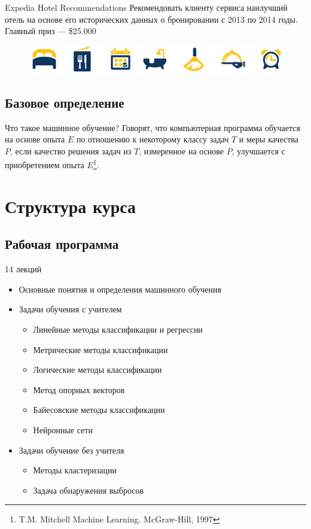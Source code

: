\documentclass{beamer}
\begin{document}
\begin{frame}{Expedia Hotel Recommendations}
    Рекомендовать клиенту сервиса наилучший отель на основе его исторических данных о бронировании с 2013 по 2014 годы. Главный приз --- \$25.000
    \begin{figure}
        \includegraphics[width=\textwidth]{fig/expedia_icons.png}
    \end{figure}
\end{frame}

\subsection{Базовое определение}
\begin{frame}{Что такое машинное обучение?}
    Говорят, что компьютерная программа обучается на основе опыта $E$ по отношению к некоторому классу задач $T$ и меры качества $P$, если качество решения задач из $T$, измеренное на основе $P$, улучшается с приобретением опыта $E$\footnote{T.M. Mitchell Machine Learning. McGraw-Hill, 1997}.
\end{frame}

\section{Структура курса}
\subsection{Рабочая программа}
\begin{frame}{14 лекций}
    \begin{itemize}
        \item Основные понятия и определения машинного обучения
        \item Задачи обучения с учителем
        \begin{itemize}
            \item Линейные методы классификации и регрессии
            \item Метрические методы классификации
            \item Логические методы классификации
            \item Метод опорных векторов
            \item Байесовские методы классификации
            \item Нейронные сети
        \end{itemize}
        \item Задачи обучение без учителя
        \begin{itemize}
            \item Методы кластеризации
            \item Задача обнаружения выбросов
        \end{itemize}
    \end{itemize}
\end{frame}
\end{document}
